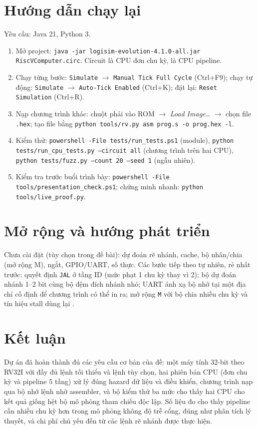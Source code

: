 \documentclass[11pt,a4paper]{article}
\newcommand{\sig}[1]{\texttt{\detokenize{#1}}}
\begin{document}
\section{Hướng dẫn chạy lại}
Yêu cầu: Java 21, Python 3.
\begin{enumerate}
  \item Mở project: \texttt{java -jar logisim-evolution-4.1.0-all.jar RiscVComputer.circ}. Circuit \sig{main} là CPU đơn chu kỳ, \sig{Pipeline} là CPU pipeline.
  \item Chạy từng bước: \texttt{Simulate} $\rightarrow$ \texttt{Manual Tick Full Cycle} (Ctrl+F9); chạy tự động: \texttt{Simulate} $\rightarrow$ \texttt{Auto-Tick Enabled} (Ctrl+K); đặt lại: \texttt{Reset Simulation} (Ctrl+R).
  \item Nạp chương trình khác: chuột phải vào ROM $\rightarrow$ \emph{Load Image\dots} $\rightarrow$ chọn file \texttt{.hex}; tạo file bằng \texttt{python tools/rv.py asm prog.s -o prog.hex -l}.
  \item Kiểm thử: \texttt{powershell -File tests/run\_tests.ps1} (module), \texttt{python tests/run\_cpu\_tests.py --circuit all} (chương trình trên hai CPU), \texttt{python tests/fuzz.py --count 20 --seed 1} (ngẫu nhiên).
  \item Kiểm tra trước buổi trình bày: \texttt{powershell -File tools/presentation\_check.ps1}; chứng minh nhanh: \texttt{python tools/live\_proof.py}.
\end{enumerate}

\section{Mở rộng và hướng phát triển}
\label{sec:future}
Chưa cài đặt (tùy chọn trong đề bài): dự đoán rẽ nhánh, cache, bộ nhân/chia (mở rộng M), ngắt, GPIO/UART, số thực. Các bước tiếp theo tự nhiên, rẻ nhất trước:
quyết định \texttt{JAL} ở tầng ID (mức phạt 1 chu kỳ thay vì 2); bộ dự đoán nhánh 1--2 bit cùng bộ đệm đích nhánh nhỏ; UART ánh xạ bộ nhớ tại một địa chỉ cố định để chương trình có thể in ra;
mở rộng \texttt{M} với bộ chia nhiều chu kỳ và tín hiệu stall dùng lại \sig{HazardUnit}.

\section{Kết luận}
Dự án đã hoàn thành đủ các yêu cầu cơ bản của đề: một máy tính 32-bit theo RV32I với đầy đủ lệnh tối thiểu và lệnh tùy chọn, hai phiên bản CPU (đơn chu kỳ và pipeline 5 tầng) xử lý đúng
hazard dữ liệu và điều khiển, chương trình nạp qua bộ nhớ lệnh nhờ assembler, và bộ kiểm thử ba mức cho thấy hai CPU cho kết quả giống hệt bộ mô phỏng tham chiếu độc lập.
Số liệu đo cho thấy pipeline cần nhiều chu kỳ hơn trong mô phỏng không độ trễ cổng, đúng như phân tích lý thuyết, và chi phí chủ yếu đến từ các lệnh rẽ nhánh được thực hiện.
\end{document}
